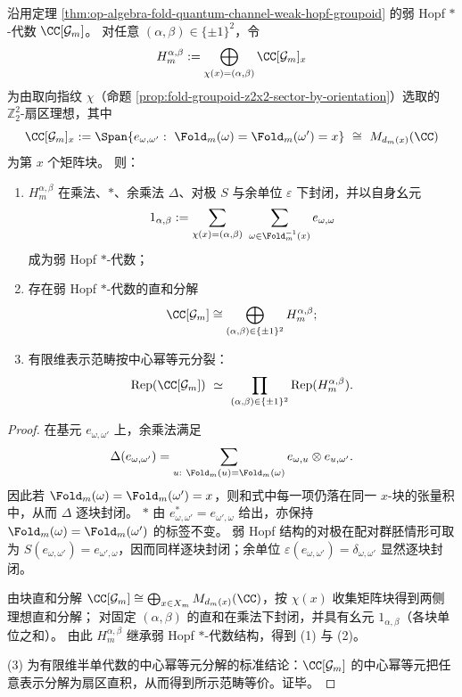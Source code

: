 

\begin{theorem}\label{thm:op-algebra-fold-weak-hopf-z2x2-sector-closure}
沿用定理 \ref{thm:op-algebra-fold-quantum-channel-weak-hopf-groupoid} 的弱 Hopf \(\ast\)-代数 \(\CC[\mathcal{G}_m]\)。
对任意 \((\alpha,\beta)\in\{\pm1\}^2\)，令
\[
H_m^{\alpha,\beta}:=\bigoplus_{\chi(x)=(\alpha,\beta)}\CC[\mathcal{G}_m]_x
\]
为由取向指纹 \(\chi\)（命题 \ref{prop:fold-groupoid-z2x2-sector-by-orientation}）选取的 \(\mathbb Z_2^2\)-扇区理想，其中
\[
\CC[\mathcal{G}_m]_x:=\Span\{e_{\omega,\omega'}:\ \Fold_m(\omega)=\Fold_m(\omega')=x\}\ \cong\ M_{d_m(x)}(\CC)
\]
为第 \(x\) 个矩阵块。
则：
\begin{enumerate}
  \item \(H_m^{\alpha,\beta}\) 在乘法、\(\ast\)、余乘法 \(\Delta\)、对极 \(S\) 与余单位 \(\varepsilon\) 下封闭，并以自身幺元
  \[
  1_{\alpha,\beta}:=\sum_{\chi(x)=(\alpha,\beta)}\ \sum_{\omega\in\Fold_m^{-1}(x)}e_{\omega,\omega}
  \]
  成为弱 Hopf \(\ast\)-代数；
  \item 存在弱 Hopf \(\ast\)-代数的直和分解
  \[
  \CC[\mathcal{G}_m]\cong\bigoplus_{(\alpha,\beta)\in\{\pm1\}^2}H_m^{\alpha,\beta};
  \]
  \item 有限维表示范畴按中心幂等元分裂：
  \[
  \mathrm{Rep}(\CC[\mathcal{G}_m])\ \simeq\ \prod_{(\alpha,\beta)\in\{\pm1\}^2}\mathrm{Rep}(H_m^{\alpha,\beta}).
  \]
\end{enumerate}
\end{theorem}
\begin{proof}
在基元 \(e_{\omega,\omega'}\) 上，余乘法满足
\[
\Delta(e_{\omega,\omega'})=\sum_{u:\ \Fold_m(u)=\Fold_m(\omega)} e_{\omega,u}\otimes e_{u,\omega'}.
\]
因此若 \(\Fold_m(\omega)=\Fold_m(\omega')=x\)，则和式中每一项仍落在同一 \(x\)-块的张量积中，从而 \(\Delta\) 逐块封闭。
\(\ast\) 由 \(e_{\omega,\omega'}^\ast=e_{\omega',\omega}\) 给出，亦保持 \(\Fold_m(\omega)=\Fold_m(\omega')\) 的标签不变。
弱 Hopf 结构的对极在配对群胚情形可取为
\(
S(e_{\omega,\omega'})=e_{\omega',\omega}
\)，因而同样逐块封闭；余单位 \(\varepsilon(e_{\omega,\omega'})=\delta_{\omega,\omega'}\) 显然逐块封闭。
\par
由块直和分解 \(\CC[\mathcal{G}_m]\cong\bigoplus_{x\in X_m}M_{d_m(x)}(\CC)\)，按 \(\chi(x)\) 收集矩阵块得到两侧理想直和分解；
对固定 \((\alpha,\beta)\) 的直和在乘法下封闭，并具有幺元 \(1_{\alpha,\beta}\)（各块单位之和）。
由此 \(H_m^{\alpha,\beta}\) 继承弱 Hopf \(\ast\)-代数结构，得到 (1) 与 (2)。
\par
(3) 为有限维半单代数的中心幂等元分解的标准结论：\(\CC[\mathcal{G}_m]\) 的中心幂等元把任意表示分解为扇区直积，从而得到所示范畴等价。证毕。
\end{proof}

